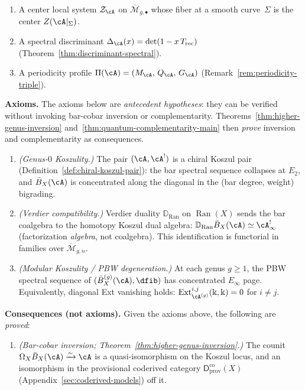 \begin{definition}
\begin{enumerate}[label=\textup{(D\arabic*)}]
\item\label{D:center-dg}
A center local system $\mathcal{Z}_{\cA}$ on
$\overline{\mathcal{M}}_{g,\bullet}$ whose fiber at a smooth
curve~$\Sigma$ is the center $Z(\cA|_\Sigma)$.

\item\label{D:discriminant-dg}
A spectral discriminant
$\Delta_{\cA}(x) = \det(1 - x\, T_{\mathrm{rec}})$
(Theorem~\ref{thm:discriminant-spectral}).

\item\label{D:periodicity-dg}
A periodicity profile
$\Pi(\cA) = (M_{\cA},\, Q_{\cA},\, G_{\cA})$
(Remark~\ref{rem:periodicity-triple}).
\end{enumerate}

\smallskip\noindent\textbf{Axioms.}
The axioms below are \emph{antecedent hypotheses}:
they can be verified without invoking bar-cobar inversion
or complementarity.  Theorems~\ref{thm:higher-genus-inversion}
and~\ref{thm:quantum-complementarity-main} then \emph{prove}
inversion and complementarity as consequences.
\begin{enumerate}[label=\textup{(MK\arabic*)}]
\item\label{MK:koszul}
\emph{(Genus-$0$ Koszulity.)}
The pair $(\cA, \cA^!)$ is a chiral Koszul pair
(Definition~\ref{def:chiral-koszul-pair}): the bar spectral
sequence collapses at $E_2$, and $\bar{B}_X(\cA)$ is concentrated
along the diagonal in the (bar degree, weight) bigrading.

\item\label{MK:verdier}
\emph{(Verdier compatibility.)}
Verdier duality $\mathbb{D}_{\operatorname{Ran}}$ on
$\operatorname{Ran}(X)$ sends the bar coalgebra to the homotopy
Koszul dual algebra:
$\mathbb{D}_{\operatorname{Ran}} \bar{B}_X(\cA) \simeq \cA^!_\infty$
(factorization \emph{algebra}, not coalgebra).
This identification is functorial in families over
$\overline{\mathcal{M}}_{g,n}$.

\item\label{MK:modular}
\emph{(Modular Koszulity / PBW degeneration.)}
At each genus $g \geq 1$, the PBW spectral sequence of
$(\bar{B}^{(g)}_X(\cA), \dfib)$ has concentrated $E_\infty$ page.
Equivalently, diagonal Ext vanishing holds:
$\operatorname{Ext}^{i,j}_{\cA^{(g)}}(\Bbbk, \Bbbk) = 0$ for $i \neq j$.
\end{enumerate}

\smallskip\noindent\textbf{Consequences (not axioms).}
Given the axioms above, the following are \emph{proved}:
\begin{enumerate}[label=\textup{(MK\arabic*)},start=4]
\item\label{MK:inversion}
\emph{(Bar-cobar inversion; Theorem~\textup{\ref{thm:higher-genus-inversion}}.)}
The counit $\Omega_X \bar{B}_X(\cA) \xrightarrow{\sim} \cA$ is a
quasi-isomorphism on the Koszul locus, and an isomorphism in the
provisional coderived category
$\mathsf{D}^{\mathrm{co}}_{\mathrm{prov}}(X)$
\textup{(}Appendix~\textup{\ref{sec:coderived-models})} off it.


\end{enumerate}
\end{definition}

